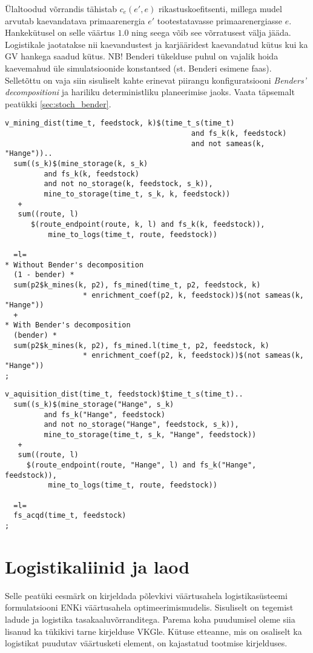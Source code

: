\documentclass[10pt,a4paper]{article}
\begin{document}
Ülaltoodud võrrandis tähistab $c_e(e', e)$ rikastuskoefitsenti, millega mudel arvutab kaevandatava primaarenergia $e'$ tootestatavasse primaarenergiasse $e$. Hankekütusel on selle väärtus $1.0$ ning seega võib see võrratusest välja jääda. Logistikale jaotatakse nii kaevandustest ja karjääridest kaevandatud kütus kui ka GV hankega saadud kütus. NB! Benderi tükelduse puhul on vajalik hoida kaevemahud üle simulatsioonide konstantsed (st. Benderi esimene faas). Selletõttu on vaja siin sisuliselt kahte erinevat piirangu konfiguratsiooni \emph{Benders' decompositioni} ja hariliku deterministliku planeerimise jaoks. Vaata täpsemalt peatükki \ref{sec:stoch_bender}.
\begin{verbatim}
v_mining_dist(time_t, feedstock, k)$(time_t_s(time_t)
                                           and fs_k(k, feedstock)
                                           and not sameas(k, "Hange"))..
  sum((s_k)$(mine_storage(k, s_k)
         and fs_k(k, feedstock)
         and not no_storage(k, feedstock, s_k)),
         mine_to_storage(time_t, s_k, k, feedstock))
   +
   sum((route, l)
      $(route_endpoint(route, k, l) and fs_k(k, feedstock)),
          mine_to_logs(time_t, route, feedstock))

  =l=
* Without Bender's decomposition
  (1 - bender) *
  sum(p2$k_mines(k, p2), fs_mined(time_t, p2, feedstock, k)
                  * enrichment_coef(p2, k, feedstock))$(not sameas(k, "Hange"))
  +
* With Bender's decomposition
  (bender) *
  sum(p2$k_mines(k, p2), fs_mined.l(time_t, p2, feedstock, k)
                  * enrichment_coef(p2, k, feedstock))$(not sameas(k, "Hange"))
;
\end{verbatim}

\begin{verbatim}
v_aquisition_dist(time_t, feedstock)$time_t_s(time_t)..
  sum((s_k)$(mine_storage("Hange", s_k)
         and fs_k("Hange", feedstock)
         and not no_storage("Hange", feedstock, s_k)),
         mine_to_storage(time_t, s_k, "Hange", feedstock))
   +
   sum((route, l)
     $(route_endpoint(route, "Hange", l) and fs_k("Hange", feedstock)),
          mine_to_logs(time_t, route, feedstock))

  =l=
  fs_acqd(time_t, feedstock)
;
\end{verbatim}


\section{Logistikaliinid ja laod}
Selle peatüki eesmärk on kirjeldada põlevkivi väärtusahela logistikasüsteemi formulatsiooni ENKi väärtusahela optimeerimismudelis. Sisuliselt on tegemist ladude ja logistika tasakaaluvõrranditega. Parema koha puudumisel oleme siia lisanud ka tükikivi tarne kirjelduse VKGle. Kütuse etteanne, mis on osaliselt ka logistikat puudutav väärtusketi element, on kajastatud tootmise kirjelduses.
\end{document}
